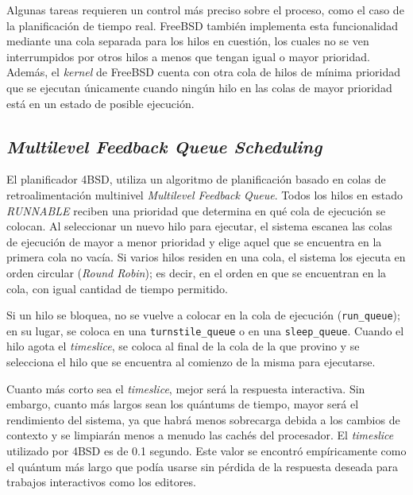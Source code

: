 Algunas tareas requieren un control más preciso sobre el proceso, como el caso de la planificación de tiempo real. FreeBSD también implementa esta funcionalidad mediante una cola separada para los hilos en cuestión, los cuales no se ven interrumpidos por otros hilos a menos que tengan igual o mayor prioridad. Además, el \textit{kernel} de FreeBSD cuenta con otra cola de hilos de mínima prioridad que se ejecutan únicamente cuando ningún hilo en las colas de mayor prioridad está en un estado de posible ejecución.\par

\subsection{\textit{Multilevel Feedback Queue Scheduling}}

El planificador 4BSD, utiliza un algoritmo de planificación basado en colas de retroalimentación multinivel \textit{Multilevel Feedback Queue}. Todos los hilos en estado \textit{RUNNABLE} reciben una prioridad que determina en qué cola de ejecución se colocan. Al seleccionar un nuevo hilo para ejecutar, el sistema escanea las colas de ejecución de mayor a menor prioridad y elige aquel que se encuentra en la primera cola no vacía. Si varios hilos residen en una cola, el sistema los ejecuta en orden circular (\textit{Round Robin}); es decir, en el orden en que se encuentran en la cola, con igual cantidad de tiempo permitido.\par

Si un hilo se bloquea, no se vuelve a colocar en la cola de ejecución (\texttt{run\_queue}); en su lugar, se coloca en una \texttt{turnstile\_queue} o en una \texttt{sleep\_queue}. Cuando el hilo agota el \textit{timeslice}, se coloca al final de la cola de la que provino y se selecciona el hilo que se encuentra al comienzo de la misma para ejecutarse.\par

Cuanto más corto sea el \textit{timeslice}, mejor será la respuesta interactiva. Sin embargo, cuanto más largos sean los quántums de tiempo, mayor será el rendimiento del sistema, ya que habrá menos sobrecarga debida a los cambios de contexto y se limpiarán menos a menudo las cachés del procesador. El \textit{timeslice} utilizado por 4BSD es de 0.1 segundo. Este valor se encontró empíricamente como el quántum más largo que podía usarse sin pérdida de la respuesta deseada para trabajos interactivos como los editores.\par

